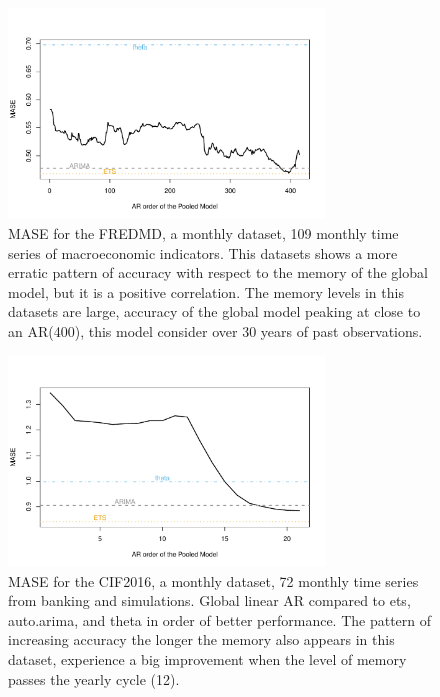\documentclass[a4paper]{article}
\theoremstyle{custom}
\begin{document}
\begin{figure}
  \centering
  \includegraphics[width=0.75\textwidth]{fig/FREDMD_MONTH.pdf}
  \caption{MASE for the FREDMD, a monthly dataset, 109 monthly time series of macroeconomic indicators. This datasets shows a more erratic pattern of accuracy with respect to the memory of the global model, but it is a positive correlation. The memory levels in this datasets are large, accuracy of the global model peaking at close to an AR(400), this model consider over 30 years of past observations.}
  \label{fig:FREDMD}
\end{figure}

\begin{figure}
  \centering
  \includegraphics[width=0.75\textwidth]{fig/CIF2016.pdf}
  \caption{MASE for the CIF2016, a monthly dataset, 72 monthly time series from banking and simulations. Global linear AR compared to ets, auto.arima, and theta in order of better performance. The pattern of increasing accuracy the longer the memory also appears in this dataset, experience a big improvement when the level of memory passes the yearly cycle (12). }
  \label{fig:CIF2016}
\end{figure}
\end{document}
